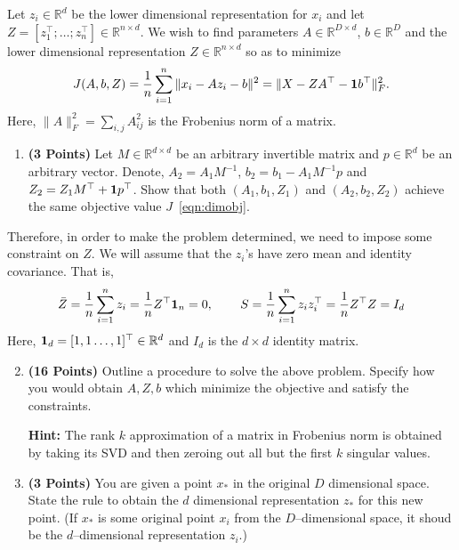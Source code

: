 \documentclass[a4paper]{article}
\newcommand*{\one}{{\bf 1}}
\newcommand{\Zbar}{\bar{Z}}
\theoremstyle{definition}
\newcommand{\RR}{\mathbb{R}}
\begin{document}
Let $z_i\in \RR^d$ be the lower dimensional representation for $x_i$ and
let $Z = [z_1^\top; \dots; z_n^\top] \in \RR^{n\times d}$.
We wish to find parameters $A \in \RR^{D\times d}$, $b\in\RR^D$ and the lower
dimensional representation $Z\in \RR^{n\times d}$ so as to minimize 
\begin{equation}
J(A,b,Z) = \frac{1}{n} \sum_{i=1}^n \|x_i - Az_i - b\|^2 = \| X - ZA^\top - \one b^\top\|_F^2.
\label{eqn:dimobj}
\end{equation}
Here, $\|A\|^2_F = \sum_{i,j} A_{ij}^2$ is the Frobenius norm of a matrix.


\begin{enumerate}
\item \textbf{(3 Points)}
Let $M\in\RR^{d\times d}$ be an arbitrary invertible matrix and $p\in\RR^{d}$ be an arbitrary vector.
Denote, $A_2 = A_1M^{-1}$, $b_2 = b_1- A_1M^{-1}p$ and $Z_2 = Z_1 M^\top +
\one p^\top$.
Show that both
$(A_1, b_1, Z_1)$ and $(A_2, b_2, Z_2)$ achieve the same objective value $J$~\eqref{eqn:dimobj}.
\end{enumerate}

Therefore, in order to make the problem determined, we need to impose some
constraint on $Z$. We will assume that the $z_i$'s have zero mean and identity covariance.
That is,
\begin{align*}
\Zbar = \frac{1}{n} \sum_{i=1}^n z_i =\frac{1}{n} Z^\top {\bf 1}_n = 0, \hspace{0.3in} 
S = \frac{1}{n} \sum_{i=1}^n z_i z_i^\top 
= \frac{1}{n} Z^\top Z
= I_d
\end{align*}
Here, ${\bf 1}_d = [1, 1 \dots, 1]^\top \in\RR^d$ and $I_d$  is the $d\times d$ identity matrix.

\begin{enumerate}
\setcounter{enumi}{1}
\item \textbf{(16 Points)}
Outline a procedure to solve the above problem. Specify how you
would obtain $A, Z, b$ which minimize the objective and satisfy the constraints.

\textbf{Hint: }The rank $k$ approximation of a matrix in Frobenius norm is obtained by
taking its SVD and then zeroing out all but the first $k$ singular values.

\item \textbf{(3 Points)}
You are given a point $x_*$ in the original $D$ dimensional space.
State the rule to obtain the $d$ dimensional
representation $z_*$ for this new point.
(If $x_*$ is some original point $x_i$ from the $D$--dimensional space, it shoud be the
$d$--dimensional representation $z_i$.)


\end{enumerate}
\end{document}
